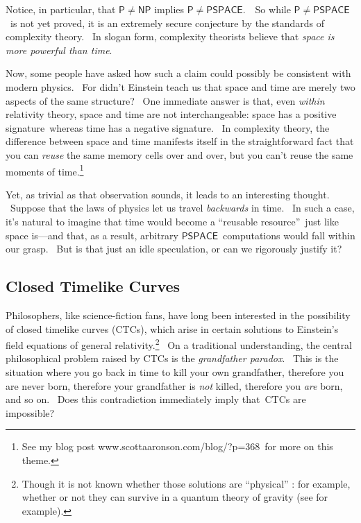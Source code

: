 \documentclass[12pt,onecolumn]{article}%
\begin{document}
Notice, in particular, that $\mathsf{P}\neq\mathsf{NP}$ implies $\mathsf{P\neq
PSPACE}$.\ \ So while $\mathsf{P\neq PSPACE}$\ is not yet proved, it is an
extremely secure conjecture by the standards of complexity theory. \ In slogan
form, complexity theorists believe that \textit{space is more powerful than
time}.

Now, some people have asked how such a claim could possibly be consistent with
modern physics. \ For didn't Einstein teach us that space and time are merely
two aspects of the same structure? \ One immediate answer is that, even
\textit{within} relativity theory, space and time are not interchangeable:
space has a positive signature\ whereas time has a negative signature. \ In
complexity theory, the difference between space and time manifests itself in
the straightforward fact that you can \textit{reuse} the same memory cells
over and over, but you can't reuse the same moments of time.\footnote{See my
blog post www.scottaaronson.com/blog/?p=368\ for more on this theme.}

Yet, as trivial as that observation sounds, it leads to an interesting
thought. \ Suppose that the laws of physics let us travel \textit{backwards
}in time. \ In such a case, it's natural to imagine that time would become a
\textquotedblleft reusable resource\textquotedblright\ just like space
is---and that, as a result, arbitrary $\mathsf{PSPACE}$\ computations would
fall within our grasp. \ But is that just an idle speculation, or can we
rigorously justify it?

\subsection{Closed Timelike Curves\label{CTC}}

Philosophers, like science-fiction fans, have long been interested in the
possibility of closed timelike curves (CTCs), which arise in certain solutions
to Einstein's field equations of general relativity.\footnote{Though it is not
known whether those solutions are \textquotedblleft physical\textquotedblright%
: for example, whether or not they can survive in a quantum theory of gravity
(see \cite{mty} for example).} \ On a traditional understanding, the central
philosophical problem raised by CTCs is the \textit{grandfather paradox}.
\ This is the situation where you go back in time to kill your own
grandfather, therefore you are never born, therefore your grandfather is
\textit{not} killed, therefore you \textit{are} born, and so on. \ Does this
contradiction immediately imply that\ CTCs are impossible?
\end{document}
